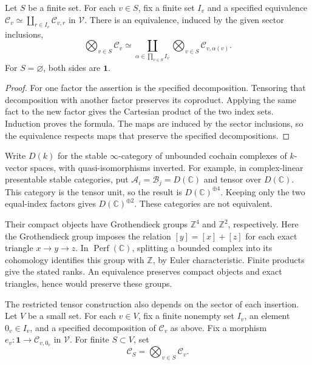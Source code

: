 \begin{proposition}
\label{v4-arith:ic:eis:finite-sectors}
Let $S$ be a finite set. For each $v\in S$, fix a finite set $I_v$ and a
specified equivalence
$\mathcal C_v\simeq\coprod_{r\in I_v}\mathcal C_{v,r}$ in $\mathcal V$.
There is an equivalence, induced by the given sector inclusions,
\[
 \bigotimes_{v\in S}\mathcal C_v
 \simeq
 \coprod_{\alpha\in\prod_{v\in S}I_v}
       \bigotimes_{v\in S}\mathcal C_{v,\alpha(v)}.
\]
For $S=\varnothing$, both sides are $\mathbf1$.
\end{proposition}

\begin{proof}
For one factor the assertion is the specified decomposition. Tensoring
that decomposition with another factor preserves its coproduct. Applying
the same fact to the new factor gives the Cartesian product of the two
index sets. Induction proves the formula. The maps are induced by the
sector inclusions, so the equivalence respects maps that preserve the
specified decompositions.
\end{proof}

Write $D(k)$ for the stable $\infty$-category of unbounded cochain
complexes of $k$-vector spaces, with quasi-isomorphisms inverted.
For example, in complex-linear presentable stable categories, put
$\mathcal A_i=\mathcal B_j=D(\mathbb C)$ and tensor over $D(\mathbb C)$.
This category is the tensor unit, so the result is $D(\mathbb C)^{\oplus4}$.
Keeping only the two equal-index factors gives $D(\mathbb C)^{\oplus2}$.
These categories are not equivalent.

Their compact objects have
Grothendieck groups $\mathbb Z^4$ and $\mathbb Z^2$, respectively.
Here the Grothendieck group imposes the relation $[y]=[x]+[z]$ for each
exact triangle $x\to y\to z$. In $\operatorname{Perf}(\mathbb C)$,
splitting a bounded complex into its cohomology identifies this group
with $\mathbb Z$, by Euler characteristic. Finite products give the
stated ranks. An equivalence preserves compact objects and exact
triangles, hence would preserve these groups.

The restricted tensor construction also depends on the sector of each
insertion. Let $V$ be a small set. For each $v\in V$, fix a finite nonempty set
$I_v$, an element $0_v\in I_v$, and a specified decomposition of
$\mathcal C_v$ as above. Fix a morphism
$e_v:\mathbf1\to\mathcal C_{v,0_v}$ in $\mathcal V$.
For finite $S\subset V$, set
\[
 \mathcal C_S=\bigotimes_{v\in S}\mathcal C_v.
\]

